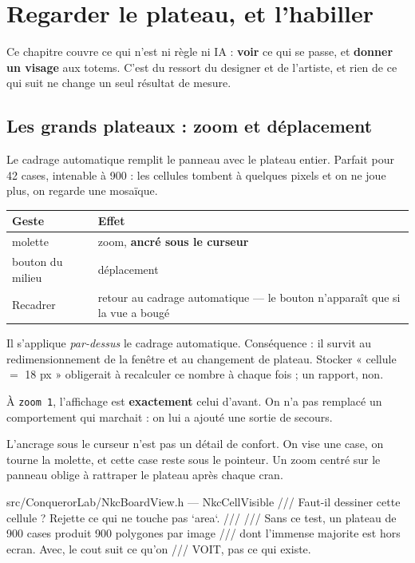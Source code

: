 \chapter{Regarder le plateau, et l'habiller}

Ce chapitre couvre ce qui n'est ni règle ni IA : \textbf{voir} ce qui se passe, et
\textbf{donner un visage} aux totems. C'est du ressort du designer et de
l'artiste, et rien de ce qui suit ne change un seul résultat de mesure.

\section{Les grands plateaux : zoom et déplacement}

Le cadrage automatique remplit le panneau avec le plateau entier. Parfait pour 42
cases, intenable à 900 : les cellules tombent à quelques pixels et on ne joue
plus, on regarde une mosaïque.

\begin{center}
\begin{tabular}{@{}p{4.2cm}p{9.6cm}@{}}
\toprule
\textbf{Geste} & \textbf{Effet} \\
\midrule
molette & zoom, \textbf{ancré sous le curseur} \\
bouton du milieu & déplacement \\
Recadrer & retour au cadrage automatique — le bouton n'apparaît que si la vue a bougé \\
\bottomrule
\end{tabular}
\end{center}

\begin{nkretenir}
Il s'applique \emph{par-dessus} le cadrage automatique. Conséquence : il survit
au redimensionnement de la fenêtre et au changement de plateau. Stocker
« cellule $=$ 18 px » obligerait à recalculer ce nombre à chaque fois ; un
rapport, non.

À \texttt{zoom 1}, l'affichage est \textbf{exactement} celui d'avant. On n'a pas
remplacé un comportement qui marchait : on lui a ajouté une sortie de secours.
\end{nkretenir}

L'ancrage sous le curseur n'est pas un détail de confort. On vise une case, on
tourne la molette, et cette case reste sous le pointeur. Un zoom centré sur le
panneau oblige à rattraper le plateau après chaque cran.

\begin{nkcode}{src/ConquerorLab/NkcBoardView.h — NkcCellVisible}
/// Faut-il dessiner cette cellule ? Rejette ce qui ne touche pas `area`.
///
/// Sans ce test, un plateau de 900 cases produit 900 polygones par image
/// dont l'immense majorite est hors ecran. Avec, le cout suit ce qu'on
/// VOIT, pas ce qui existe.
\end{nkcode}

